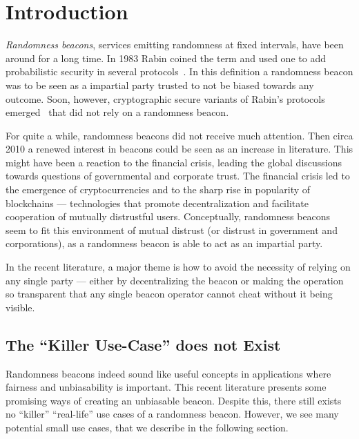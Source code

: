 \section{Introduction}

\emph{Randomness beacons}, services emitting randomness at fixed intervals, have been around for a long time.
In 1983 Rabin coined the term and used one to add probabilistic security in several protocols~.
In this definition a randomness beacon was to be seen as a impartial party trusted to not be biased towards any outcome.
Soon, however, cryptographic secure variants of Rabin's protocols emerged~ that did not rely on a randomness beacon.

For quite a while, randomness beacons did not receive much attention. Then circa 2010 a renewed interest in beacons could be seen as an increase in literature.
This might have been a reaction to the financial crisis, leading the global discussions towards questions of governmental and corporate trust.
The financial crisis led to the emergence of cryptocurrencies and to the sharp rise in popularity of blockchains --- technologies that promote decentralization and facilitate cooperation of mutually distrustful users.
Conceptually, randomness beacons seem to fit this environment of mutual distrust (or distrust in government and corporations), as a randomness beacon is able to act as an impartial party.

In the recent literature, a major theme is how to avoid the necessity of relying on any single party --- either by decentralizing the beacon or making the operation so transparent that any single beacon operator cannot cheat without it being visible.

\subsection{The \enquote{Killer Use-Case} does not Exist}

Randomness beacons indeed sound like useful concepts in applications where fairness and unbiasability is important.
This recent literature presents some promising ways of creating an unbiasable beacon. Despite this, there still exists no \enquote{killer} \enquote{real-life} use cases of a randomness beacon.  However, we see many potential small use cases, that we describe in the following section. 


